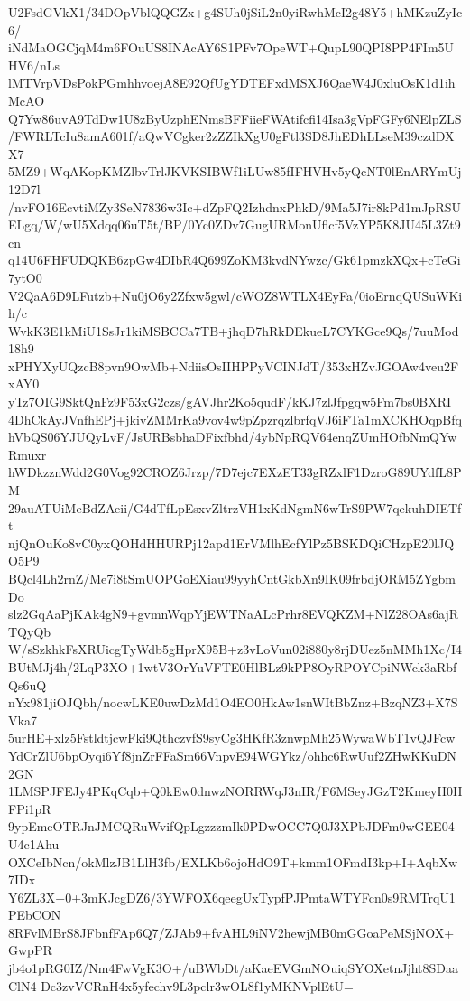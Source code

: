 U2FsdGVkX1/34DOpVblQQGZx+g4SUh0jSiL2n0yiRwhMcI2g48Y5+hMKzuZyIc6/
iNdMaOGCjqM4m6FOuUS8INAcAY6S1PFv7OpeWT+QupL90QPI8PP4FIm5UHV6/nLs
lMTVrpVDsPokPGmhhvoejA8E92QfUgYDTEFxdMSXJ6QaeW4J0xluOsK1d1ihMcAO
Q7Yw86uvA9TdDw1U8zByUzphENmsBFFiieFWAtifcfi14Isa3gVpFGFy6NElpZLS
/FWRLTcIu8amA601f/aQwVCgker2zZZIkXgU0gFtl3SD8JhEDhLLseM39czdDXX7
5MZ9+WqAKopKMZlbvTrlJKVKSIBWf1iLUw85fIFHVHv5yQcNT0lEnARYmUj12D7l
/nvFO16EcvtiMZy3SeN7836w3Ic+dZpFQ2IzhdnxPhkD/9Ma5J7ir8kPd1mJpRSU
ELgq/W/wU5Xdqq06uT5t/BP/0Yc0ZDv7GugURMonUflcf5VzYP5K8JU45L3Zt9cn
q14U6FHFUDQKB6zpGw4DIbR4Q699ZoKM3kvdNYwzc/Gk61pmzkXQx+cTeGi7ytO0
V2QaA6D9LFutzb+Nu0jO6y2Zfxw5gwl/cWOZ8WTLX4EyFa/0ioErnqQUSuWKih/c
WvkK3E1kMiU1SsJr1kiMSBCCa7TB+jhqD7hRkDEkueL7CYKGce9Qs/7uuMod18h9
xPHYXyUQzcB8pvn9OwMb+NdiisOsIIHPPyVCINJdT/353xHZvJGOAw4veu2FxAY0
yTz7OIG9SktQnFz9F53xG2czs/gAVJhr2Ko5qudF/kKJ7zlJfpgqw5Fm7bs0BXRI
4DhCkAyJVnfhEPj+jkivZMMrKa9vov4w9pZpzrqzlbrfqVJ6iFTa1mXCKHOqpBfq
hVbQS06YJUQyLvF/JsURBsbhaDFixfbhd/4ybNpRQV64enqZUmHOfbNmQYwRmuxr
hWDkzznWdd2G0Vog92CROZ6Jrzp/7D7ejc7EXzET33gRZxlF1DzroG89UYdfL8PM
29auATUiMeBdZAeii/G4dTfLpEsxvZltrzVH1xKdNgmN6wTrS9PW7qekuhDIETft
njQnOuKo8vC0yxQOHdHHURPj12apd1ErVMlhEcfYlPz5BSKDQiCHzpE20lJQO5P9
BQcl4Lh2rnZ/Me7i8tSmUOPGoEXiau99yyhCntGkbXn9IK09frbdjORM5ZYgbmDo
slz2GqAaPjKAk4gN9+gvmnWqpYjEWTNaALcPrhr8EVQKZM+NlZ28OAs6ajRTQyQb
W/sSzkhkFsXRUicgTyWdb5gHprX95B+z3vLoVun02i880y8rjDUez5nMMh1Xc/I4
BUtMJj4h/2LqP3XO+1wtV3OrYuVFTE0HlBLz9kPP8OyRPOYCpiNWck3aRbfQs6uQ
nYx981jiOJQbh/nocwLKE0uwDzMd1O4EO0HkAw1snWItBbZnz+BzqNZ3+X7SVka7
5urHE+xlz5FstldtjcwFki9QthczvfS9syCg3HKfR3znwpMh25WywaWbT1vQJFcw
YdCrZlU6bpOyqi6Yf8jnZrFFaSm66VnpvE94WGYkz/ohhc6RwUuf2ZHwKKuDN2GN
1LMSPJFEJy4PKqCqb+Q0kEw0dnwzNORRWqJ3nIR/F6MSeyJGzT2KmeyH0HFPi1pR
9ypEmeOTRJnJMCQRuWvifQpLgzzzmIk0PDwOCC7Q0J3XPbJDFm0wGEE04U4c1Ahu
OXCeIbNcn/okMlzJB1LlH3fb/EXLKb6ojoHdO9T+kmm1OFmdI3kp+I+AqbXw7IDx
Y6ZL3X+0+3mKJcgDZ6/3YWFOX6qeegUxTypfPJPmtaWTYFcn0s9RMTrqU1PEbCON
8RFvlMBrS8JFbnfFAp6Q7/ZJAb9+fvAHL9iNV2hewjMB0mGGoaPeMSjNOX+GwpPR
jb4o1pRG0IZ/Nm4FwVgK3O+/uBWbDt/aKaeEVGmNOuiqSYOXetnJjht8SDaaClN4
Dc3zvVCRnH4x5yfechv9L3pclr3wOL8f1yMKNVplEtU=
